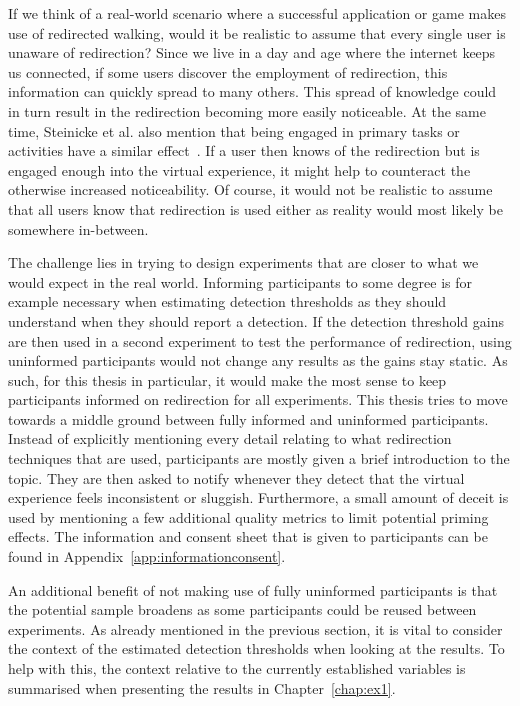 If we think of a real-world scenario where a successful application or game makes use of redirected walking, would it be realistic to assume that every single user is unaware of redirection? Since we live in a day and age where the internet keeps us connected, if some users discover the employment of redirection, this information can quickly spread to many others. This spread of knowledge could in turn result in the redirection becoming more easily noticeable. At the same time, Steinicke et al. also mention that being engaged in primary tasks or activities have a similar effect~\cite{5072212}. If a user then knows of the redirection but is engaged enough into the virtual experience, it might help to counteract the otherwise increased noticeability. Of course, it would not be realistic to assume that all users know that redirection is used either as reality would most likely be somewhere in-between. 
 
The challenge lies in trying to design experiments that are closer to what we would expect in the real world. Informing participants to some degree is for example necessary when estimating detection thresholds as they should understand when they should report a detection. If the detection threshold gains are then used in a second experiment to test the performance of redirection, using uninformed participants would not change any results as the gains stay static. As such, for this thesis in particular, it would make the most sense to keep participants informed on redirection for all experiments. This thesis tries to move towards a middle ground between fully informed and uninformed participants. Instead of explicitly mentioning every detail relating to what redirection techniques that are used, participants are mostly given a brief introduction to the topic. They are then asked to notify whenever they detect that the virtual experience feels inconsistent or sluggish. Furthermore, a small amount of deceit is used by mentioning a few additional quality metrics to limit potential priming effects. The information and consent sheet that is given to participants can be found in Appendix~\ref{app:informationconsent}.

An additional benefit of not making use of fully uninformed participants is that the potential sample broadens as some participants could be reused between experiments. As already mentioned in the previous section, it is vital to consider the context of the estimated detection thresholds when looking at the results. To help with this, the context relative to the currently established variables is summarised when presenting the results in Chapter~\ref{chap:ex1}. 

